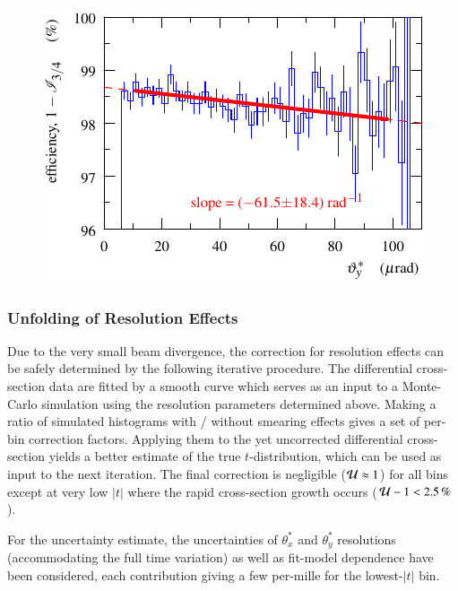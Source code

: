 \begin{figure}
\begin{center}
\includegraphics{fig/eff3outof4_fits.pdf}
\caption{%
}
\label{fig:eff 3/4}
\end{center}
\end{figure}



\subsubsection{Unfolding of Resolution Effects}
\label{sec:unfolding}

Due to the very small beam divergence, the correction for resolution effects can be safely determined by the following iterative procedure. The differential cross-section data are fitted by a smooth curve which serves as an input to a Monte-Carlo simulation using the resolution parameters determined above. Making a ratio of simulated histograms with / without smearing effects gives a set of per-bin correction factors. Applying them to the yet uncorrected differential cross-section yields a better estimate of the true $t$-distribution, which can be used as input to the next iteration. The final correction is negligible (${\cal U} \approx 1$) for all bins except at very low $|t|$ where the rapid cross-section growth occurs ($ {\cal U} - 1 < 2.5\un{\%}$).

For the uncertainty estimate, the uncertainties of $\theta_x^*$ and $\theta_y^*$ resolutions (accommodating the full time variation) as well as fit-model dependence have been considered, each contribution giving a few per-mille for the lowest-$|t|$ bin.

